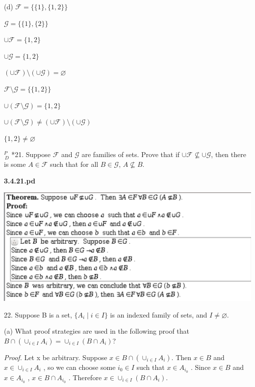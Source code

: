 \documentclass{article}
\begin{document}
\vspace{30pt}

(d) $\mathcal{F} = \{\{1\}, \{1,2\}\}$

$\mathcal{G} = \{\{1\}, \{2\}\}$

$\cup \mathcal{F} = \{1, 2\}$

$\cup \mathcal{G} = \{1, 2\}$

$(\cup\mathcal{F}) \setminus (\cup\mathcal{G}) = \varnothing$

$\mathcal{F} \setminus \mathcal{G} = \{\{1,2\}\}$

$\cup (\mathcal{F} \setminus \mathcal{G}) = \{1, 2\}$

$\cup (\mathcal{F} \setminus \mathcal{G}) \neq (\cup\mathcal{F}) \setminus (\cup\mathcal{G})$

$\{1,2\} \neq \varnothing$

\vspace{30pt}

$^{\textit{P}}_{\, \textit{D}}$ *21. Suppose $\mathcal{F}$ and $\mathcal{G}$ are families of sets. Prove that if $\cup \mathcal{F} \nsubseteq \cup\mathcal{G}$, then there is some $A \in \mathcal{F}$ such that for all $B \in \mathcal{G}$, $A \nsubseteq B$.
\vspace{30pt}

\textbf{3.4.21.pd}
\vspace{10pt}

\includegraphics[width=\textwidth]{3_4_21}

\vspace{30pt}

22. Suppose B is a set, $\{A_i \mid i \in I\}$ is an indexed family of sets, and $I \neq \varnothing$.

\hspace{12pt}(a) What proof strategies are used in the following proof that $B \cap
(\cup_{i \in I} A_i) = \cup_{i \in I} (B \cap A_i)$?

\textit{Proof.} Let x be arbitrary. Suppose $x \in B \cap (\cup_{i \in I} A_i)$. Then $x \in B$
and $x \in \cup_{i \in I} A_i$ , so we can choose some $i_0 \in I$ such that $x \in A_{i_0}$ .
Since $x \in B$ and $x \in A_{i_0}$ , $x \in B \cap A_{i_0}$ . Therefore $x \in \cup_{i \in I} (B \cap
A_i)$.
\end{document}
